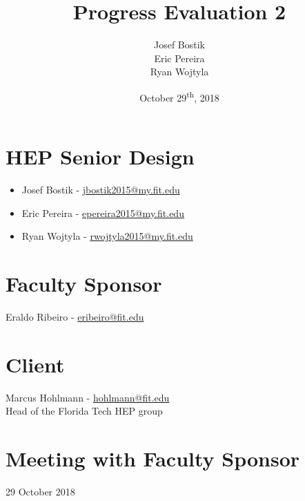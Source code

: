 \documentclass[12pt]{article}
\newcommand\tab[1][1cm]{\hspace*{#1}}
\begin{document}
\begin{titlepage}
	
\author{Josef Bostik\\
	Eric Pereira\\
	Ryan Wojtyla\\}
\date{October 29\textsuperscript{th}, 2018}
\title{Progress Evaluation 2}

\maketitle

\end{titlepage}

\tableofcontents

\newpage {}

\section{HEP Senior Design}

\begin{itemize}
	\item Josef Bostik - \href{mailto:jbostik2015@my.fit.edu}{jbostik2015@my.fit.edu}
	\item Eric Pereira - \href{mailto:epereira2015@my.fit.edu}{epereira2015@my.fit.edu }
	\item Ryan Wojtyla - \href{mailto:rwojtyla2015@my.fit.edu}{rwojtyla2015@my.fit.edu}
\end{itemize}

\section{Faculty Sponsor}

\tab Eraldo Ribeiro - \href{mailto:eribeiro@fit.edu}{eribeiro@fit.edu}

\section{Client}

\tab Marcus Hohlmann - \href{mailto:hohlmann@fit.edu}{hohlmann@fit.edu} \\ 
\tab Head of the Florida Tech HEP group

\section{Meeting with Faculty Sponsor}
\tab 29 October 2018
\end{document}
